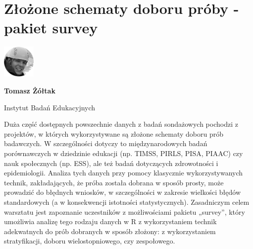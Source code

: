 \documentclass[\main/boa.tex]{subfiles}
\begin{document}
\section{Złożone schematy doboru próby - pakiet survey}
\begin{minipage}[t]{0.915\textwidth}
	\center     
    \includegraphics[width=60px]{img/workshops/czarno_biale/zoltak.png} 
\end{minipage}

\begin{minipage}{0.915\textwidth}
\centering
{\bf {} Tomasz Żółtak}
\end{minipage}

\vskip 0.3cm

\begin{affiliations}
\begin{minipage}{0.915\textwidth}
\centering
\large Instytut Badań Edukacyjnych  \\[2pt]
\end{minipage}
\end{affiliations}

\vskip 0.8cm

\opiswarsztatu Duża część dostępnych powszechnie danych z badań sondażowych pochodzi z projektów, w których wykorzystywane są złożone schematy doboru prób badawczych. W szczególności dotyczy to międzynarodowych badań porównawczych w dziedzinie edukacji (np. TIMSS, PIRLS, PISA, PIAAC) czy nauk społecznych (np. ESS), ale też badań dotyczących zdrowotności i epidemiologii. Analiza tych danych przy pomocy klasycznie wykorzystywanych technik, zakładających, że próba została dobrana w sposób prosty, może prowadzić do błędnych wniosków, w szczególności w zakresie wielkości błędów standardowych (a w konsekwencji istotności statystycznych). Zasadniczym celem warsztatu jest zapoznanie uczestników z możliwościami pakietu „survey”, który umożliwia analizę tego rodzaju danych w R z wykorzystaniem technik adekwatnych do prób dobranych w sposób złożony: z wykorzystaniem stratyfikacji, doboru wielostopniowego, czy zespołowego.
\end{document}
